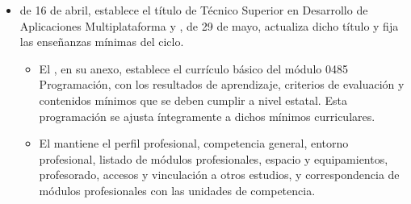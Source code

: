 \begin{itemize}
     \item  \label{rd:450-2010_l} de 16 de abril, establece el título de Técnico Superior en Desarrollo de Aplicaciones Multiplataforma 
     y
     \label{rd:405-2023_l}, de 29 de mayo, actualiza dicho título y fija las enseñanzas mínimas del ciclo.
     \begin{itemize}
         \item El  , en su anexo, establece el currículo básico del módulo 0485 Programación, con los resultados de aprendizaje, criterios de evaluación y contenidos mínimos que se deben cumplir a nivel estatal. Esta programación se ajusta íntegramente a dichos mínimos curriculares.
         \item El  mantiene el perfil profesional, competencia general, entorno profesional, listado de módulos profesionales, espacio y equipamientos, profesorado, accesos y vinculación a otros estudios, y correspondencia de módulos profesionales con las unidades de competencia.
     \end{itemize}
 \end{itemize}
 
